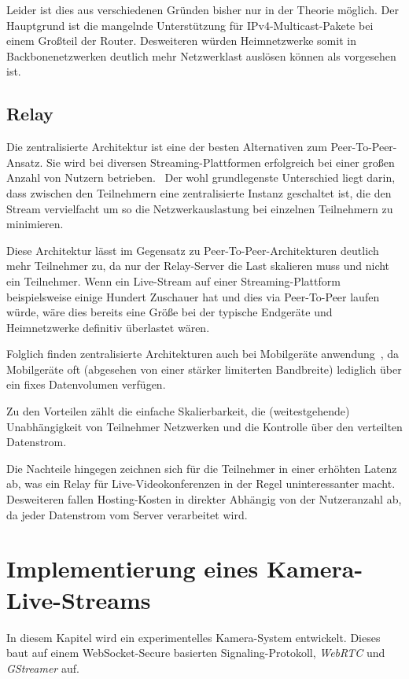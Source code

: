 \documentclass{article}
\begin{document}
\begin{onecolumn}
Leider ist dies aus verschiedenen Gründen bisher nur in der Theorie möglich.
Der Hauptgrund ist die mangelnde Unterstützung für IPv4-Multicast-Pakete bei
einem Großteil der Router. Desweiteren würden Heimnetzwerke somit in
Backbonenetzwerken deutlich mehr Netzwerklast auslösen können als vorgesehen
ist.

\subsection{Relay}

Die zentralisierte Architektur ist eine der besten Alternativen zum
Peer-To-Peer-Ansatz. Sie wird bei diversen Streaming-Plattformen erfolgreich
bei einer großen Anzahl von Nutzern betrieben.~\cite{YoutubeRTMP, TwitchRTMP}
Der wohl grundlegenste Unterschied liegt darin, dass zwischen den Teilnehmern
eine zentralisierte Instanz geschaltet ist, die den Stream vervielfacht um so
die Netzwerkauslastung bei einzelnen Teilnehmern zu minimieren.

Diese Architektur lässt im Gegensatz zu Peer-To-Peer-Architekturen deutlich
mehr Teilnehmer zu, da nur der Relay-Server die Last skalieren muss und nicht
ein Teilnehmer. Wenn ein Live-Stream auf einer Streaming-Plattform
beispielsweise einige Hundert Zuschauer hat und dies via Peer-To-Peer laufen
würde, wäre dies bereits eine Größe bei der typische Endgeräte und
Heimnetzwerke definitiv überlastet wären.

Folglich finden zentralisierte Architekturen auch bei Mobilgeräte
anwendung~\cite{YoutubeRTMP, TwitchRTMP}, da Mobilgeräte oft (abgesehen von
einer stärker limiterten Bandbreite) lediglich über ein fixes Datenvolumen
verfügen.

Zu den Vorteilen zählt die einfache Skalierbarkeit, die (weitestgehende)
Unabhängigkeit von Teilnehmer Netzwerken und die Kontrolle über den verteilten
Datenstrom.

Die Nachteile hingegen zeichnen sich für die Teilnehmer in einer erhöhten
Latenz ab, was ein Relay für Live-Videokonferenzen in der Regel uninteressanter
macht. Desweiteren fallen Hosting-Kosten in direkter Abhängig von der
Nutzeranzahl ab, da jeder Datenstrom vom Server verarbeitet wird.

\section{Implementierung eines Kamera-Live-Streams}

In diesem Kapitel wird ein experimentelles Kamera-System entwickelt. Dieses
baut auf einem WebSocket-Secure basierten Signaling-Protokoll, \textit{WebRTC}
und \textit{GStreamer} auf.


\end{onecolumn}
\end{document}
